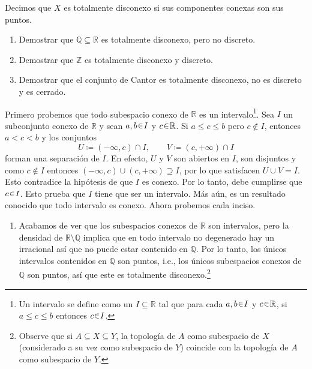 \begin{ejer}
Decimos que $X$ es totalmente disconexo si sus componentes conexas son sus puntos.
\begin{enumerate}
    \item[a)] Demostrar que $\mathbb{Q}\subseteq\mathbb{R}$ es totalmente disconexo, pero no discreto.
    \item[b)] Demostrar que $\mathbb{Z}$ es totalmente disconexo y discreto.
    \item[c)] Demostrar que el conjunto de Cantor es totalmente disconexo, no es discreto y es cerrado.
\end{enumerate}
\end{ejer}
\begin{sol}[Demostración]
Primero probemos que todo subespacio conexo de $\mathbb{R}$ es un intervalo\footnote{Un intervalo se define como un $I \subseteq \mathbb{R}$ tal que para cada $a,b \en I$ y $c \en \mathbb{R}$, si $a\leq c \leq b$ entonces $c \en I$.}. 
Sea $I$ un subconjunto conexo de $\mathbb{R}$ y sean $a,b \en I$ y $c \en \mathbb{R}$. 
Si $a \leq c \leq b$ pero $c \notin I$, entonces $a < c < b$ y los conjuntos
\[
   U \coloneq (-\infty, c) \cap I,
   \qquad 
   V \coloneq (c, +\infty) \cap I
\]
forman una separación de $I$. En efecto, $U$ y $V$ son abiertos en $I$, son disjuntos y como $c \notin I$ entonces $(-\infty, c) \cup (c, +\infty) \supseteq I$, por lo que satisfacen $U \cup V = I$. Esto contradice la hipótesis de que $I$ es conexo. Por lo tanto, debe cumplirse que $c \en I$. Esto prueba que $I$ tiene que ser un intervalo. Más aún, es un resultado conocido que todo intervalo es conexo. Ahora probemos cada inciso.
    \begin{enumerate}[label = (\alph*)]
    \item Acabamos de ver que los subespacios conexos de $\mathbb{R}$ son intervalos, pero la densidad de $\mathbb{R}\setminus\mathbb{Q}$ implica que en todo intervalo no degenerado hay un irracional así que no puede estar contenido en $\mathbb{Q}$. Por lo tanto, los únicos intervalos contenidos en $\mathbb{Q}$ son puntos, i.e., los únicos subespacios conexos de $\mathbb{Q}$ son puntos, así que este es totalmente disconexo.\footnote{Observe que si $A \subseteq X \subseteq Y$, la topología de $A$ como subespacio de $X$ (considerado a su vez como subespacio de $Y$) coincide con la topología de $A$ como subespacio de $Y$.}

\end{enumerate}
\end{sol}
